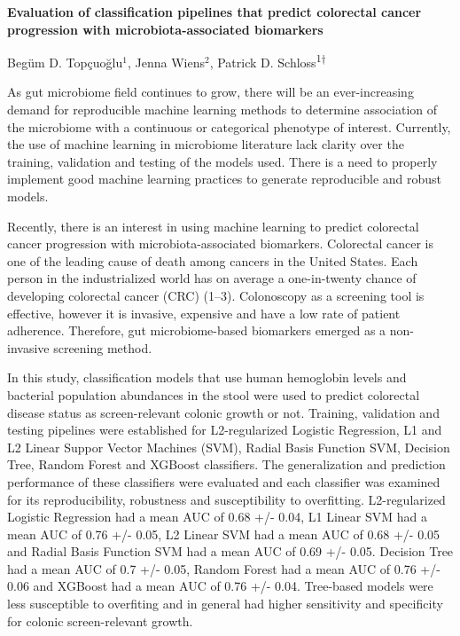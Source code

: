 \documentclass[11pt,]{article}
\title{}
\author{}
\date{}
\begin{document}
\linenumbers
\textbf{Evaluation of classification pipelines that predict colorectal
cancer progression with microbiota-associated biomarkers}

Begüm D. Topçuoğlu\({^1}\), Jenna Wiens\({^2}\), Patrick D.
Schloss\textsuperscript{1\(\dagger\)}

As gut microbiome field continues to grow, there will be an
ever-increasing demand for reproducible machine learning methods to
determine association of the microbiome with a continuous or categorical
phenotype of interest. Currently, the use of machine learning in
microbiome literature lack clarity over the training, validation and
testing of the models used. There is a need to properly implement good
machine learning practices to generate reproducible and robust models.

Recently, there is an interest in using machine learning to predict
colorectal cancer progression with microbiota-associated biomarkers.
Colorectal cancer is one of the leading cause of death among cancers in
the United States. Each person in the industrialized world has on
average a one-in-twenty chance of developing colorectal cancer (CRC)
(1--3). Colonoscopy as a screening tool is effective, however it is
invasive, expensive and have a low rate of patient adherence. Therefore,
gut microbiome-based biomarkers emerged as a non-invasive screening
method.

In this study, classification models that use human hemoglobin levels
and bacterial population abundances in the stool were used to predict
colorectal disease status as screen-relevant colonic growth or not.
Training, validation and testing pipelines were established for
L2-regularized Logistic Regression, L1 and L2 Linear Suppor Vector
Machines (SVM), Radial Basis Function SVM, Decision Tree, Random Forest
and XGBoost classifiers. The generalization and prediction performance
of these classifiers were evaluated and each classifier was examined for
its reproducibility, robustness and susceptibility to overfitting.
L2-regularized Logistic Regression had a mean AUC of 0.68 +/- 0.04, L1
Linear SVM had a mean AUC of 0.76 +/- 0.05, L2 Linear SVM had a mean AUC
of 0.68 +/- 0.05 and Radial Basis Function SVM had a mean AUC of 0.69
+/- 0.05. Decision Tree had a mean AUC of 0.7 +/- 0.05, Random Forest
had a mean AUC of 0.76 +/- 0.06 and XGBoost had a mean AUC of 0.76 +/-
0.04. Tree-based models were less susceptible to overfiting and in
general had higher sensitivity and specificity for colonic
screen-relevant growth.
\end{document}
